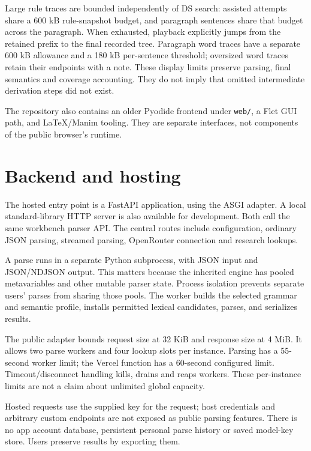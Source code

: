 \documentclass[11pt,a4paper]{article}
\begin{document}
Large rule traces are bounded independently of DS search: assisted
attempts share a 600 kB rule-snapshot budget, and paragraph sentences
share that budget across the paragraph. When exhausted, playback
explicitly jumps from the retained prefix to the final recorded tree.
Paragraph word traces have a separate 600 kB allowance and a 180 kB
per-sentence threshold; oversized word traces retain their endpoints
with a note. These display limits preserve parsing, final semantics and
coverage accounting. They do not imply that omitted intermediate
derivation steps did not exist.

The repository also contains an older Pyodide frontend under
\nolinkurl{web/}, a Flet GUI path, and LaTeX/Manim tooling. They are
separate interfaces, not components of the public browser's runtime.

\section{Backend and hosting}\label{backend-and-hosting}

The hosted entry point is a FastAPI application, using the ASGI adapter.
A local standard-library HTTP server is also available for development.
Both call the same workbench parser API. The central routes include
configuration, ordinary JSON parsing, streamed parsing, OpenRouter
connection and research lookups.

A parse runs in a separate Python subprocess, with JSON input and
JSON/NDJSON output. This matters because the inherited engine has pooled
metavariables and other mutable parser state. Process isolation prevents
separate users' parses from sharing those pools. The worker builds the
selected grammar and semantic profile, installs permitted lexical
candidates, parses, and serializes results.

The public adapter bounds request size at 32 KiB and response size at 4
MiB. It allows two parse workers and four lookup slots per instance.
Parsing has a 55-second worker limit; the Vercel function has a
60-second configured limit. Timeout/disconnect handling kills, drains
and reaps workers. These per-instance limits are not a claim about
unlimited global capacity.

Hosted requests use the supplied key for the request; host credentials
and arbitrary custom endpoints are not exposed as public parsing
features. There is no app account database, persistent personal parse
history or saved model-key store. Users preserve results by exporting
them.
\end{document}
